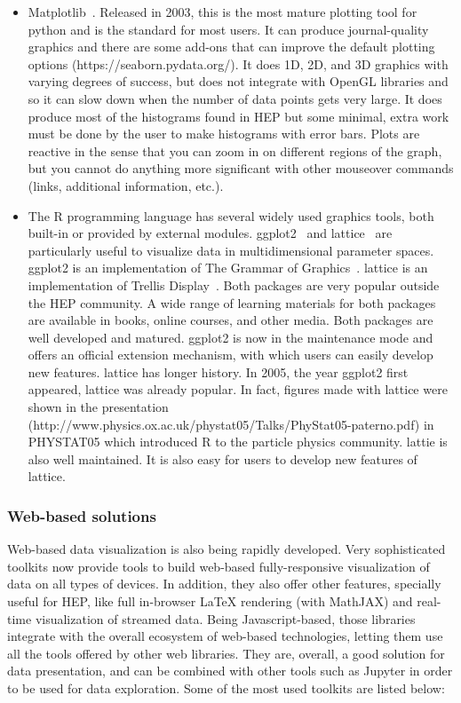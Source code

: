 \documentclass[12pt,a4paper]{article}
\begin{document}
\begin{itemize}
\item Matplotlib~\cite{Hunter2007}. Released in 2003, this is the most mature plotting tool for python and is the standard
for most users. It can produce journal-quality graphics and there are some add-ons that can improve the default plotting
options (https://seaborn.pydata.org/). It does 1D, 2D, and 3D graphics with varying degrees of success, but does not
integrate with OpenGL libraries and so it can slow down when the number of data points gets very large.
It does produce most of the histograms found in HEP but some minimal, extra work must be done by the user
to make histograms with error bars. Plots are reactive in the sense that you can zoom in on different regions of the graph,
but you cannot do anything more significant with other mouseover commands (links, additional information, etc.).

\item The R programming language has several widely used graphics tools, both built-in or provided by external modules.
ggplot2~\cite{Wickham2009} and lattice~\cite{Sarkar2008} are particularly useful to visualize data in multidimensional parameter spaces.
ggplot2 is an implementation of The Grammar of Graphics~\cite{Wilkinson2005}. lattice is an implementation of Trellis Display~\cite{Trellis}.
Both packages are very popular outside the HEP community. A wide range of learning materials for both packages are available in
books, online courses, and other media. Both packages are well developed and matured. ggplot2 is now in the maintenance mode
and offers an official extension mechanism, with which users can easily develop new features. lattice has longer history.
In 2005, the year ggplot2 first appeared, lattice was already popular. In fact, figures made with lattice were shown in the
presentation (http://www.physics.ox.ac.uk/phystat05/Talks/PhyStat05-paterno.pdf) in PHYSTAT05 which introduced R to the
particle physics community. lattie is also well maintained. It is also easy for users to develop new features of lattice.
\end{itemize}

\hypertarget{stats-web}{%
\subsubsection{Web-based solutions}\label{stats-web}}

Web-based data visualization is also being rapidly developed. Very sophisticated toolkits now provide tools to build web-based
fully-responsive visualization of data on all types of devices. In addition, they also offer other features, specially useful
for HEP, like full in-browser LaTeX rendering (with MathJAX) and real-time visualization of streamed data. Being Javascript-based,
those libraries integrate with the overall ecosystem of web-based technologies, letting them use all the tools offered by other
web libraries. They are, overall, a good solution for data presentation, and can be combined with other tools such as Jupyter
in order to be used for data exploration. Some of the most used toolkits are listed below:
\end{document}
